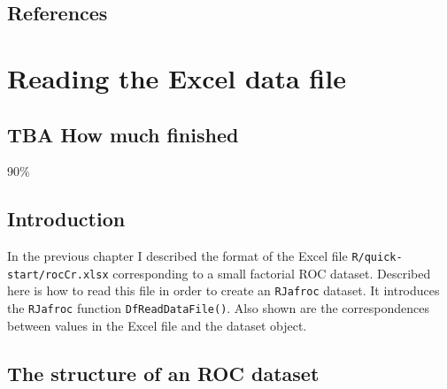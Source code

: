 \documentclass[
]{book}
\begin{document}
\hypertarget{quick-start-data-format-references}{%
\section{References}\label{quick-start-data-format-references}}

\hypertarget{quick-start-read-datafile}{%
\chapter{Reading the Excel data file}\label{quick-start-read-datafile}}

\hypertarget{quick-start-read-datafile-how-much-finished}{%
\section{TBA How much finished}\label{quick-start-read-datafile-how-much-finished}}

90\%

\hypertarget{quick-start-read-datafile-intro}{%
\section{Introduction}\label{quick-start-read-datafile-intro}}

In the previous chapter I described the format of the Excel file \texttt{R/quick-start/rocCr.xlsx} corresponding to a small factorial ROC dataset. Described here is how to read this file in order to create an \texttt{RJafroc} dataset. It introduces the \texttt{RJafroc} function \texttt{DfReadDataFile()}. Also shown are the correspondences between values in the Excel file and the dataset object.

\hypertarget{quick-start-read-datafile-structure-roc-dataset}{%
\section{The structure of an ROC dataset}\label{quick-start-read-datafile-structure-roc-dataset}}
\end{document}
